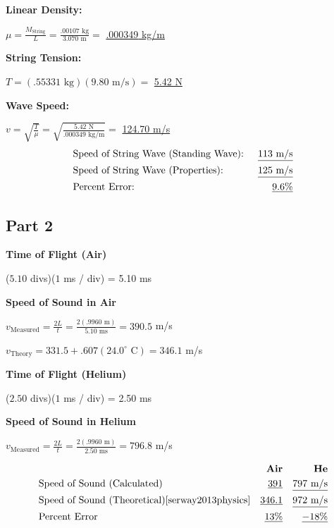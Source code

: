 \documentclass[twocolumn,english]{IEEEtran}
\theoremstyle{plain}
\theoremstyle{plain}
\begin{document}
\textbf{Linear Density: }

$\mu = \frac{M_{\text{String}}}{L} = \frac{.00107\text{ kg}}{3.070\text{ m}} = $
\underline{ .000349{ kg/m}}

\textbf{String Tension: }

$T = (.55331\text{ kg})(9.80\text{ m/s}) =$ \underline{5.42 N}

\textbf{Wave Speed: }

$v = \sqrt{\frac{T}{\mu}} = \sqrt{\frac{5.42\text{ N}}{.000349 \text{ kg/m}}} =$
\underline{124.70 m/s} \\%

\noindent\hrulefill
\begin{align*}
 &\text{Speed of String Wave (Standing Wave): } &\text{\underline{$113$ m/s}} \\
 &\text{Speed of String Wave (Properties): }	&\text{\underline{$125$ m/s}} \\
 &\text{Percent Error: } 			&\text{\underline{$9.6$\%}}
\end{align*}
\noindent\hrulefill

\subsection*{Part 2}

\textbf{Time of Flight (Air)}

($5.10$ divs)($1$ ms / div) = 5.10 ms

\textbf{Speed of Sound in Air}

$v_{\text{Measured}}=\frac{2L}{t}=\frac{2(.9960\text{ m})}{5.10\text{ ms}} = 390.5$ m/s

$v_{\text{Theory}} = 331.5 + .607(24.0^{\circ}\text{ C}) = 346.1$ m/s

\textbf{Time of Flight (Helium)}

($2.50$ divs)($1$ ms / div) = 2.50 ms

\textbf{Speed of Sound in Helium}

$v_{\text{Measured}}=\frac{2L}{t}=\frac{2(.9960\text{ m})}{2.50\text{ ms}} = 796.8$ m/s


\noindent\hrulefill
\begin{align*}
 &					&\text{\textbf{Air}}	&	&\text{\textbf{He}}	\\
 &\text{Speed of Sound (Calculated)} 	&\text{\underline{$391$}} &	&\text{\underline{$797$ m/s}} \\
 &\text{Speed of Sound (Theoretical)\cite{serway2013physics}} 	&\text{\underline{$346.1$}} &	&\text{\underline{$972$ m/s}} \\
 &\text{Percent Error}			&\text{\underline{$13\%$}}	&	&\text{\underline{$-18\%$}}
\end{align*}
\noindent\hrulefill
\end{document}
